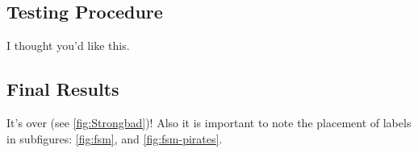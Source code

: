 \documentclass[letterpaper,12pt]{article}
\begin{document}
\subsection{Testing Procedure}
I thought you'd like this.

\subsection{Final Results}
It's over (see \ref{fig:Strongbad})!  Also it is important to note the placement of labels in subfigures: \ref{fig:fsm}, and \ref{fig:fsm-pirates}.
\end{document}
